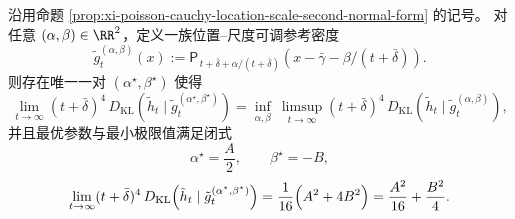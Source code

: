 \begin{theorem}\label{thm:xi-poisson-cauchy-location-scale-information-projection}
沿用命题 \ref{prop:xi-poisson-cauchy-location-scale-second-normal-form} 的记号。
对任意 \((\alpha,\beta)\in\RR^2\)，定义一族位置--尺度可调参考密度
\begin{equation}\label{eq:xi-poisson-cauchy-location-scale-gab}
\tilde g_t^{(\alpha,\beta)}(x)
:=\mathsf P_{\,t+\bar\delta+\alpha/(t+\bar\delta)}\!\left(x-\bar\gamma-\beta/(t+\bar\delta)\right).
\end{equation}
则存在唯一一对 \((\alpha^\star,\beta^\star)\) 使得
\begin{equation}\label{eq:xi-poisson-cauchy-location-scale-information-projection-optimal}
\lim_{t\to\infty}(t+\bar\delta)^4\,D_{\mathrm{KL}}\!\left(\tilde h_t\mid \tilde g_t^{(\alpha^\star,\beta^\star)}\right)
=\inf_{\alpha,\beta}\ \limsup_{t\to\infty}(t+\bar\delta)^4\,D_{\mathrm{KL}}\!\left(\tilde h_t\mid \tilde g_t^{(\alpha,\beta)}\right),
\end{equation}
并且最优参数与最小极限值满足闭式
\[
\alpha^\star=\frac{A}{2},\qquad
\beta^\star=-B,
\]
\[
\lim_{t\to\infty}(t+\bar\delta)^4\,D_{\mathrm{KL}}\!\left(\tilde h_t\mid \tilde g_t^{(\alpha^\star,\beta^\star)}\right)
=\frac{1}{16}\Bigl(A^2+4B^2\Bigr)
=\frac{A^2}{16}+\frac{B^2}{4}.
\]
\end{theorem}
